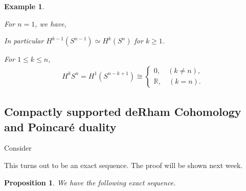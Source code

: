 \documentclass[10pt]{article}
\newtheorem{proposition}{Proposition}[section]
\newtheorem{example}{Example}[section]
\newcommand{\R}[0]{\mathbb{R}}
\newcommand{\M}[0]{\mathcal{M}}
\begin{document}
\begin{example}
\begin{center}
\begin{tikzcd}
\end{tikzcd}
  \end{center}
  For $n=1$, we have,
  \begin{center}
  \end{center}
  In particular $H^{k-1}(S^{n-1})\simeq H^k(S^n)$ for $k\geq1$.
  \par For $1\leq k\leq n$, 
  \begin{align*}
    H^kS^n = H^1(S^{n-k+1})\cong\begin{cases}
      0,\quad (k\not=n),\\
      \R,\quad (k=n).
    \end{cases}
  \end{align*}
\end{example}

\subsection{Compactly supported deRham Cohomology and Poincaré duality}

Consider 
\begin{center}
\end{center}

This turns out to be an exact sequence. The proof will be shown next week.

\begin{proposition}
  We have the following exact sequence.
  \begin{center}
  \end{center}
\end{proposition}
\end{document}
